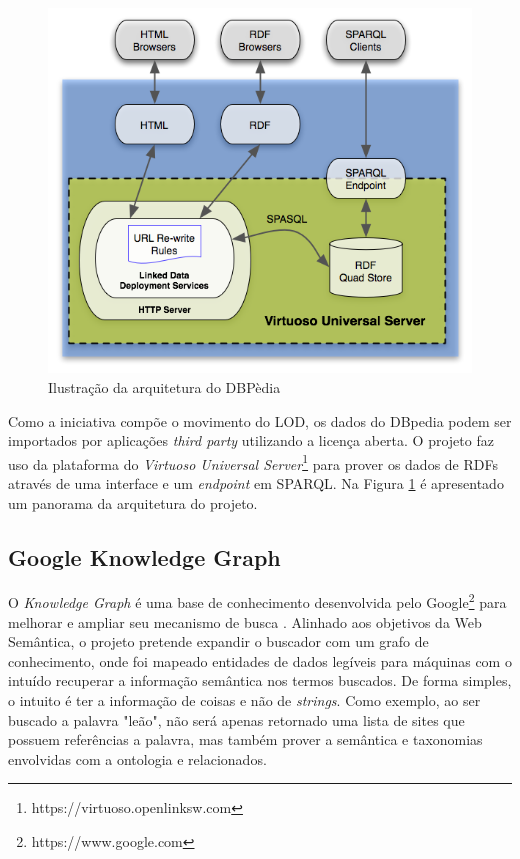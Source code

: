 \begin{figure}
	\centering
	\includegraphics[scale=0.55]{imagens/dbpedia_virtuoso.png}
	\caption{Ilustração da arquitetura do DBPèdia \citep{DBPediaVirtuoso}}
	\label{fig:dbpedia-virtuoso}
\end{figure}

Como a iniciativa compõe o movimento do LOD, os dados do DBpedia podem ser importados por aplicações \textit{third party} utilizando a licença aberta. O projeto faz uso da plataforma do \textit{Virtuoso Universal Server}\footnote{https://virtuoso.openlinksw.com} para prover os dados de RDFs através de uma interface e um \textit{endpoint} em SPARQL. Na Figura \ref{fig:dbpedia-virtuoso} é apresentado um panorama da arquitetura do projeto.

\subsection{Google Knowledge Graph}

O \textit{Knowledge Graph} é uma base de conhecimento desenvolvida pelo Google\footnote{https://www.google.com} para melhorar e ampliar seu mecanismo de busca \citep{GoogleKnowledge}. Alinhado aos objetivos da Web Semântica, o projeto pretende expandir o buscador com um grafo de conhecimento, onde foi mapeado entidades de dados legíveis para máquinas com o intuído recuperar a informação semântica nos termos buscados. De forma simples, o intuito é ter a informação de coisas e não de \textit{strings}. Como exemplo, ao ser buscado a palavra "leão", não será apenas retornado uma lista de sites que possuem referências a palavra, mas também prover a semântica e taxonomias envolvidas com a ontologia e relacionados.

